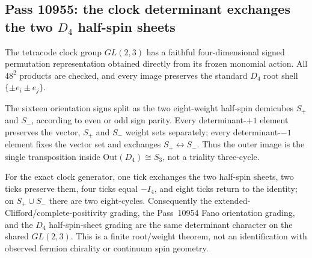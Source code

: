 \subsection{Pass 10955: the clock determinant exchanges the two $D_4$ half-spin sheets}

The tetracode clock group $GL(2,3)$ has a faithful four-dimensional signed
permutation representation obtained directly from its frozen monomial action.
All $48^2$ products are checked, and every image preserves the standard
$D_4$ root shell $\{\pm e_i\pm e_j\}$.

The sixteen orientation signs split as the two eight-weight half-spin
demicubes $S_+$ and $S_-$, according to even or odd sign parity.  Every
determinant-$+1$ element preserves the vector, $S_+$ and $S_-$ weight sets
separately; every determinant-$-1$ element fixes the vector set and exchanges
$S_+\leftrightarrow S_-$.  Thus the outer image is the single transposition
inside $\mathrm{Out}(D_4)\cong S_3$, not a triality three-cycle.

For the exact clock generator, one tick exchanges the two half-spin sheets,
two ticks preserve them, four ticks equal $-I_4$, and eight ticks return to
the identity; on $S_+\cup S_-$ there are two eight-cycles.  Consequently the
extended-Clifford/complete-positivity grading, the Pass~10954 Fano orientation
grading, and the $D_4$ half-spin-sheet grading are the same determinant
character on the shared $GL(2,3)$.  This is a finite root/weight theorem, not
an identification with observed fermion chirality or continuum spin geometry.
